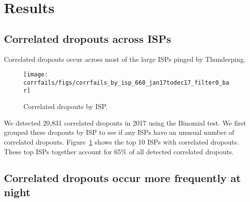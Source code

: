 

\section{Results}



\subsection{Correlated dropouts across ISPs}

Correlated dropouts occur across most of the large ISPs pinged by Thunderping.

\begin{figure}[t]
\centering
\texttt{[image: corrfails/figs/corrfails\_by\_isp\_660\_jan17todec17\_filter0\_bar]}
\caption{
\label{fig:corr_dropouts_across_isps}
Correlated dropouts by ISP.}
\end{figure}

We detected 20,831 correlated dropouts in 2017 using the Binomial
test. We first grouped these dropouts by ISP to see if any ISPs have an
unusual number of correlated dropouts. Figure~\ref{fig:corr_dropouts_across_isps} shows the top 10
ISPs with correlated dropouts. These top ISPs together account for 65\% of all detected correlated dropouts.





\subsection{Correlated dropouts occur more frequently at night}

